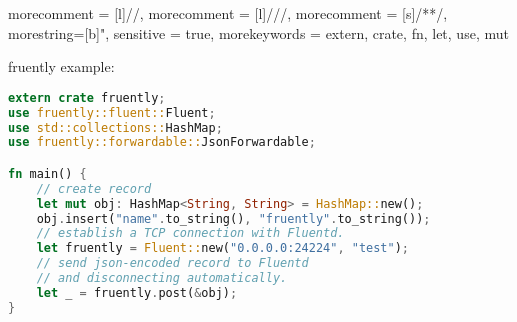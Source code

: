 \documentclass[12pt, unicode]{beamer}
\begin{document}
 {
  morecomment = [l]{//},
  morecomment = [l]{///},
  morecomment = [s]{/*}{*/},
  morestring=[b]",
  sensitive = true,
  morekeywords = {extern, crate, fn, let, use, mut}
}
\newcommand\Small{\fontsize{9}{9.2}\selectfont}
\begin{frame}[fragile]
fruently example:
\begin{lstlisting}[language={Rust},basicstyle=\ttfamily\Small]
extern crate fruently;
use fruently::fluent::Fluent;
use std::collections::HashMap;
use fruently::forwardable::JsonForwardable;

fn main() {
    // create record
    let mut obj: HashMap<String, String> = HashMap::new();
    obj.insert("name".to_string(), "fruently".to_string());
    // establish a TCP connection with Fluentd.
    let fruently = Fluent::new("0.0.0.0:24224", "test");
    // send json-encoded record to Fluentd
    // and disconnecting automatically.
    let _ = fruently.post(&obj);
}
\end{lstlisting}
\end{frame}

\end{document}
